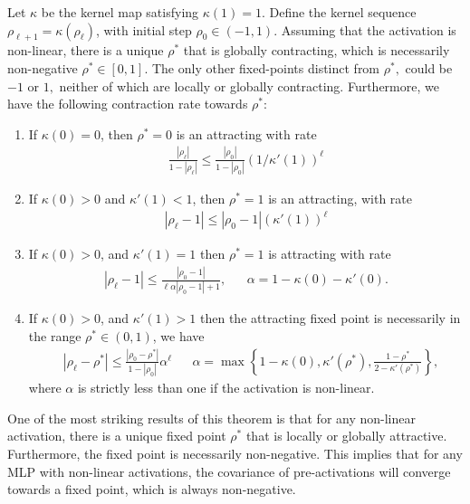\begin{theorem}
Let $\kappa$ be the kernel map satisfying $\kappa(1)=1$. Define the kernel sequence $\rho_{\ell+1}=\kappa(\rho_\ell)$, with initial step $\rho_0 \in (-1,1)$. Assuming that the activation is non-linear, there is a unique $\rho^*$ that is globally contracting, which is necessarily non-negative $\rho^*\in[0,1].$ The only other fixed-points distinct from $\rho^*,$ could be $-1$ or $1,$ neither of which are locally or globally contracting. Furthermore, we have the following contraction rate towards $\rho^*$:
\begin{enumerate}
    \item If $\kappa(0)=0$, then $\rho^*=0$ is an attracting with rate 
    \begin{align}
    \frac{|\rho_\ell|}{1-|\rho_\ell|} \le \frac{|\rho_0|}{1-|\rho_0|} (1/\kappa'(1))^\ell
    \end{align}
    \item If $\kappa(0)>0$ and $\kappa'(1)<1$, then $\rho^*=1$ is an attracting, with rate 
    \begin{align}
    |\rho_\ell-1| \le |\rho_0-1| (\kappa'(1))^\ell
    \end{align}
    \item If $\kappa(0) > 0$, and $\kappa'(1)=1$ then  $\rho^*=1$ is attracting with rate 
    \begin{align}
    |\rho_\ell-1| \le \frac{|\rho_0-1|}{\ell\alpha|\rho_0-1|+1}, && \alpha = 1-\kappa(0)-\kappa'(0).
    \end{align}
    \item If $\kappa(0) > 0$, and $\kappa'(1)>1$ then the attracting fixed point is necessarily in the range $\rho^*\in(0,1)$, we have  
    \begin{align}
    &|\rho_\ell-\rho^*| \le \frac{|\rho_0-\rho^*|}{1-|\rho_0|}\alpha^\ell && \alpha = \max\left\{1-\kappa(0),\kappa'(\rho^*),\frac{1-\rho^*}{2-\kappa'(\rho^*)}\right\},
    \end{align}
    where $\alpha$ is strictly less than one if the activation is non-linear.
\end{enumerate}
\end{theorem}

\begin{remark}
One of the most striking results of this theorem is that for any non-linear activation, there is a unique fixed point $\rho^*$ that is locally or globally attractive. Furthermore, the fixed point is necessarily non-negative. This implies that for any MLP with non-linear activations, the covariance of pre-activations will converge towards a fixed point, which is always non-negative. 
\end{remark}

